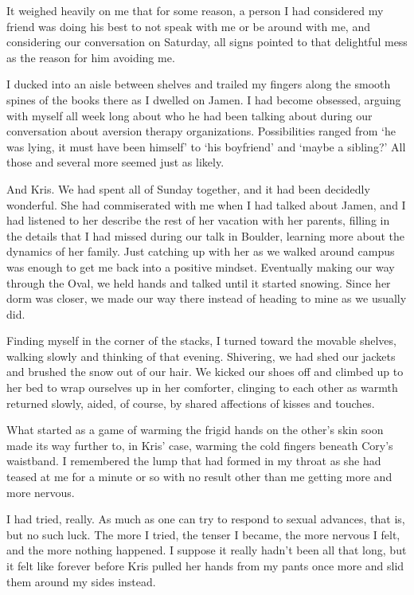 It weighed heavily on me that for some reason, a person I had considered my friend was doing his best to not speak with me or be around with me, and considering our conversation on Saturday, all signs pointed to that delightful mess as the reason for him avoiding me.

I ducked into an aisle between shelves and trailed my fingers along the smooth spines of the books there as I dwelled on Jamen.  I had become obsessed, arguing with myself all week long about who he had been talking about during our conversation about aversion therapy organizations.  Possibilities ranged from `he was lying, it must have been himself' to `his boyfriend' and `maybe a sibling?'  All those and several more seemed just as likely.

And Kris.  We had spent all of Sunday together, and it had been decidedly wonderful.  She had commiserated with me when I had talked about Jamen, and I had listened to her describe the rest of her vacation with her parents, filling in the details that I had missed during our talk in Boulder, learning more about the dynamics of her family.  Just catching up with her as we walked around campus was enough to get me back into a positive mindset.  Eventually making our way through the Oval, we held hands and talked until it started snowing.  Since her dorm was closer, we made our way there instead of heading to mine as we usually did.

Finding myself in the corner of the stacks, I turned toward the movable shelves, walking slowly and thinking of that evening.  Shivering, we had shed our jackets and brushed the snow out of our hair.  We kicked our shoes off and climbed up to her bed to wrap ourselves up in her comforter, clinging to each other as warmth returned slowly, aided, of course, by shared affections of kisses and touches.

What started as a game of warming the frigid hands on the other's skin soon made its way further to, in Kris' case, warming the cold fingers beneath Cory's waistband.  I remembered the lump that had formed in my throat as she had teased at me for a minute or so with no result other than me getting more and more nervous.

I had tried, really.  As much as one can try to respond to sexual advances, that is, but no such luck.  The more I tried, the tenser I became, the more nervous I felt, and the more nothing happened.  I suppose it really hadn't been all that long, but it felt like forever before Kris pulled her hands from my pants once more and slid them around my sides instead.

